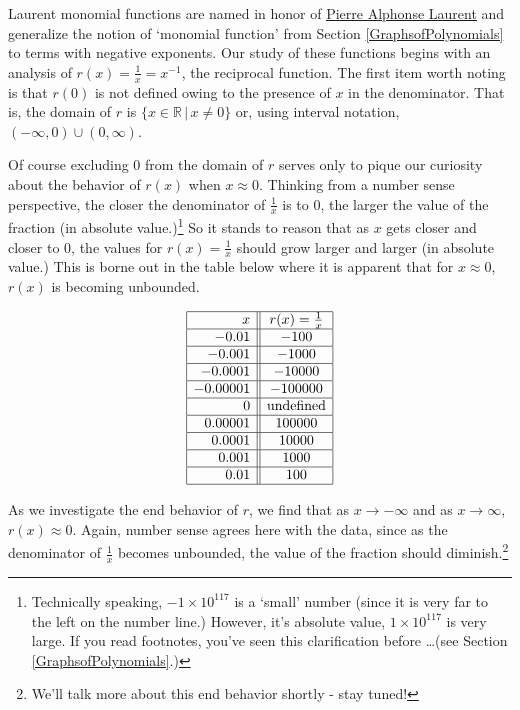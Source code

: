 \documentclass{ximera}
\begin{document}

Laurent monomial functions are named in honor of \href{https://en.wikipedia.org/wiki/Pierre_Alphonse_Laurent}{\underline{Pierre Alphonse Laurent}} and generalize the notion of `monomial function' from Section \ref{GraphsofPolynomials} to terms with negative exponents. Our study of these functions begins with an analysis of   $r(x) = \frac{1}{x} = x^{-1}$, the reciprocal function. The first item worth  noting is that $r(0)$ is not defined owing to the presence of $x$  in the denominator.  That is, the domain of $r$ is $\{ x \in \mathbb{R} \, | \, x \neq 0\}$ or, using interval notation, $(-\infty, 0) \cup (0, \infty)$.   

Of course excluding $0$ from the domain of $r$ serves only to pique our curiosity about the behavior of $r(x)$ when $x \approx 0$.  Thinking from a number sense perspective, the closer the denominator of $\frac{1}{x}$ is to $0$, the larger the value of the  fraction (in absolute value.)\footnote{Technically speaking, $-1 \times 10^{117}$ is a `small' number (since it is very far to the left on the number line.)  However, it's absolute value, $1 \times 10^{117}$ is very large.  If you read footnotes, you've seen this clarification before \ldots (see Section \ref{GraphsofPolynomials}.)}  So it stands to reason that as $x$ gets closer and closer to $0$, the values for $r(x) = \frac{1}{x}$ should grow larger and larger (in absolute value.)  This is borne out in the table below where it is apparent that for $x \approx 0$, $r(x)$ is becoming unbounded.

\[\begin{array}{|r||c|}  \hline
x & r(x) = \frac{1}{x}  \\ \hline
 -0.01& -100  \\  \hline
 -0.001 & -1000  \\  \hline 
 -0.0001 & -10000  \\  \hline 
 -0.00001 & -100000 \\  \hline 
0 & \text{undefined} \\  \hline
0.00001 & 100000 \\  \hline  
0.0001 & 10000  \\  \hline 
 0.001 & 1000  \\  \hline 
 0.01 & 100  \\  \hline
  \end{array}\]



As we investigate the end behavior of $r$, we find that as $x \rightarrow -\infty$ and as $x \rightarrow \infty$, $r(x) \approx 0$. Again, number sense agrees here with the data, since as the denominator of $\frac{1}{x}$ becomes unbounded, the value of the fraction should diminish.\footnote{We'll talk more about this end behavior shortly - stay tuned!} 
\end{document}
